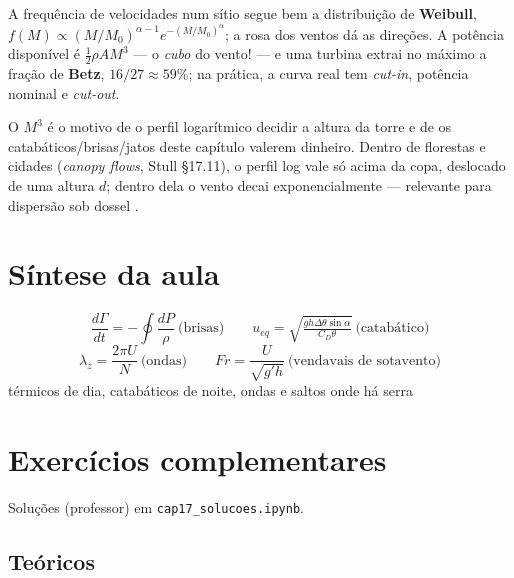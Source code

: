 \documentclass[11pt]{article}
\begin{document}
\begin{formalivro}
A frequência de velocidades num sítio segue bem a distribuição de
\textbf{Weibull},
$f(M) \propto (M/M_0)^{\alpha-1}e^{-(M/M_0)^\alpha}$; a rosa dos
ventos dá as direções. A potência disponível é
$\tfrac12\rho A M^3$ — o \emph{cubo} do vento! — e uma turbina extrai
no máximo a fração de \textbf{Betz}, $16/27 \approx 59\%$; na
prática, a curva real tem \emph{cut-in}, potência nominal e
\emph{cut-out}.
\end{formalivro}

O $M^3$ é o motivo de o perfil logarítmico decidir a altura da torre
 e de os catabáticos/brisas/jatos deste
capítulo valerem dinheiro. Dentro de florestas e cidades
(\emph{canopy flows}, Stull \S17.11), o perfil log vale só acima da
copa, deslocado de uma altura $d$; dentro dela o vento decai
exponencialmente — relevante para dispersão sob dossel
.

\section{Síntese da aula}

\begin{noquadro}
\[ \frac{d\Gamma}{dt} = -\oint\frac{dP}{\rho}\ \text{(brisas)} \qquad
u_{eq} = \sqrt{\tfrac{gh\Delta\theta\sin\alpha}{C_D\theta}}\
\text{(catabático)} \]
\[ \lambda_z = \frac{2\pi U}{N}\ \text{(ondas)} \qquad
Fr = \frac{U}{\sqrt{g'h}}\ \text{(vendavais de sotavento)} \]
térmicos de dia, catabáticos de noite, ondas e saltos onde há serra
\end{noquadro}

\section{Exercícios complementares}\label{sec:exercicios}

Soluções (professor) em \texttt{cap17\_solucoes.ipynb}.

\subsection*{Teóricos}
\end{document}

